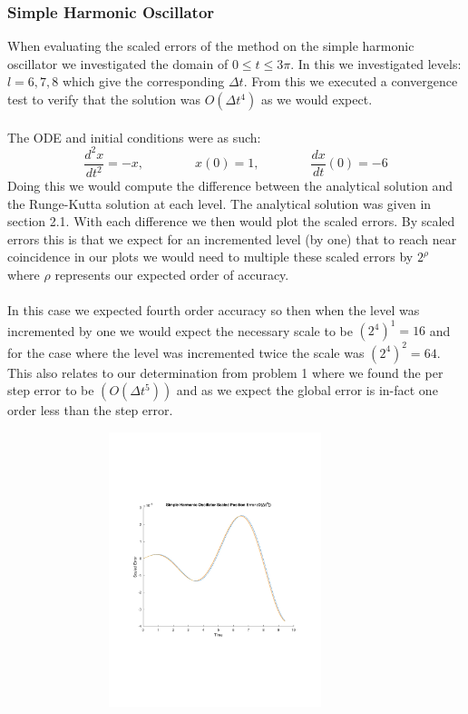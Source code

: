 \documentclass{article}
\begin{document}
\subsubsection{Simple Harmonic Oscillator}
When evaluating the scaled errors of the method on the simple harmonic oscillator we investigated the domain of $0 \leq t \leq 3 \pi$. In this we investigated levels: $l = 6, 7, 8$ which give the corresponding $\Delta t$. From this we executed a convergence test to verify that the solution was $O(\Delta t^4)$ as we would expect.\\
\\
The ODE and initial conditions were as such: $$\frac{d^2x}{dt^2} = -x, \qquad\qquad x(0) = 1, \qquad\qquad \frac{dx}{dt}(0) = -6$$
Doing this we would compute the difference between the analytical solution and the Runge-Kutta solution at each level. The analytical solution was given in section 2.1. With each difference we then would plot the scaled errors. By scaled errors this is that we expect for an incremented level (by one) that to reach near coincidence in our plots we would need to multiple these scaled errors by $2^\rho$ where $\rho$ represents our expected order of accuracy. \\
\\
In this case we expected fourth order accuracy so then when the level was incremented by one we would expect the necessary scale to be $(2^4)^1 = 16$ and for the case where the level was incremented twice the scale was $(2^4)^2 = 64$. This also relates to our determination from problem 1 where we found the per step error to be $(O(\Delta t^5))$ and as we expect the global error is in-fact one order less than the step error.\\
\begin{figure}[!h]
    \centering
    \includegraphics[width=10cm, height=8cm]{figures/sho_scaledErrors.pdf}
\end{figure}
\end{document}
